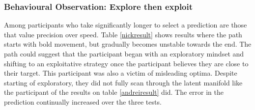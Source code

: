 \documentclass[ %
author={Dillon Keith Diep},
supervisor={Dr. Carl Henrik Ek},
degree={MEng},
title={ART-CG Hair:},
subtitle={Assisted Real-time Content Generation of Stylised Virtual Hair},
type={Research},
year={2017} ]{dissertation}
\begin{document}
	\subsubsection{Behavioural Observation: Explore then exploit}
	
	Among participants who take significantly longer to select a prediction are those that value precision over speed. Table \ref{nickresult} shows results where the path starts with bold movement, but gradually becomes unstable towards the end. The path could suggest that the participant began with an exploratory mindset and shifting to an exploitative strategy once the participant believes they are close to their target. This participant was also a victim of misleading optima. Despite starting of exploratory, they did not fully scan through the latent manifold like the participant of the results on table \ref{andreiresult} did. The error in the prediction continually increased over the three tests.
	
\end{document}
